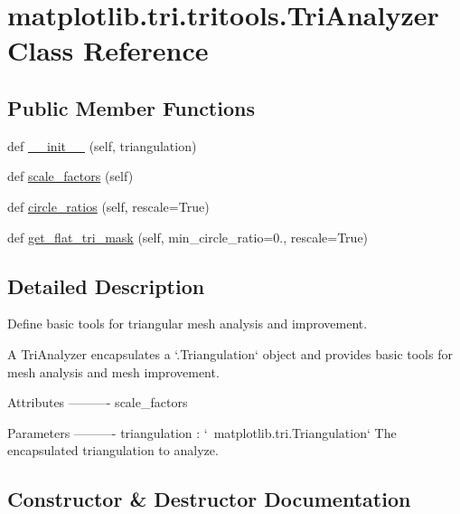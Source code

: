 \hypertarget{classmatplotlib_1_1tri_1_1tritools_1_1TriAnalyzer}{}\section{matplotlib.\+tri.\+tritools.\+Tri\+Analyzer Class Reference}
\label{classmatplotlib_1_1tri_1_1tritools_1_1TriAnalyzer}
\subsection*{Public Member Functions}
\begin{DoxyCompactItemize}
\item 
def \hyperlink{classmatplotlib_1_1tri_1_1tritools_1_1TriAnalyzer_a84935776e10664ad667a76a68f02a7d9}{\+\_\+\+\_\+init\+\_\+\+\_\+} (self, triangulation)
\item 
def \hyperlink{classmatplotlib_1_1tri_1_1tritools_1_1TriAnalyzer_a60b57a242c096c306f6bce822fdfba1a}{scale\+\_\+factors} (self)
\item 
def \hyperlink{classmatplotlib_1_1tri_1_1tritools_1_1TriAnalyzer_a8e10c628fc8056d83ce6f90a1e15c072}{circle\+\_\+ratios} (self, rescale=True)
\item 
def \hyperlink{classmatplotlib_1_1tri_1_1tritools_1_1TriAnalyzer_a61da9fb10a28d5b0b5de2011b8a3ba27}{get\+\_\+flat\+\_\+tri\+\_\+mask} (self, min\+\_\+circle\+\_\+ratio=0., rescale=True)
\end{DoxyCompactItemize}


\subsection{Detailed Description}
\begin{DoxyVerb}Define basic tools for triangular mesh analysis and improvement.

A TriAnalyzer encapsulates a `.Triangulation` object and provides basic
tools for mesh analysis and mesh improvement.

Attributes
----------
scale_factors

Parameters
----------
triangulation : `~matplotlib.tri.Triangulation`
    The encapsulated triangulation to analyze.
\end{DoxyVerb}
 

\subsection{Constructor \& Destructor Documentation}
\mbox{\label{classmatplotlib_1_1tri_1_1tritools_1_1TriAnalyzer_a84935776e10664ad667a76a68f02a7d9}} 
